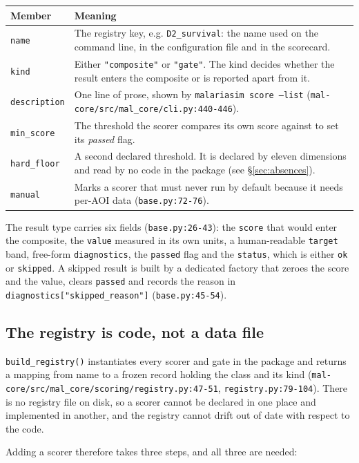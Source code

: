 \documentclass[11pt,a4paper]{article}
\newcommand{\code}[1]{\texttt{#1}}
\begin{document}
\begin{longtable}{@{}p{2.9cm}p{11.1cm}@{}}
\toprule
Member & Meaning \\
\midrule
\endhead
\code{name} & The registry key, e.g. \code{D2\_survival}: the name used on the
command line, in the configuration file and in the scorecard. \\
\code{kind} & Either \code{"composite"} or \code{"gate"}. The kind decides
whether the result enters the composite or is reported apart from it. \\
\code{description} & One line of prose, shown by \code{malariasim score
--list} (\code{mal-core/src/mal\_core/cli.py:440-446}). \\
\code{min\_score} & The threshold the scorer compares its own score against
to set its \emph{passed} flag. \\
\code{hard\_floor} & A second declared threshold. It is declared by eleven
dimensions and read by no code in the package (see
\S\ref{sec:absences}). \\
\code{manual} & Marks a scorer that must never run by default because it
needs per-AOI data (\code{base.py:72-76}). \\
\end{longtable}

The result type carries six fields (\code{base.py:26-43}): the \code{score}
that would enter the composite, the \code{value} measured in its own units, a
human-readable \code{target} band, free-form \code{diagnostics}, the
\code{passed} flag and the \code{status}, which is either \code{ok} or
\code{skipped}. A skipped result is built by a dedicated factory that zeroes
the score and the value, clears \code{passed} and records the reason in
\code{diagnostics["skipped\_reason"]} (\code{base.py:45-54}).

\subsection{The registry is code, not a data file}

\code{build\_registry()} instantiates every scorer and gate in the package
and returns a mapping from name to a frozen record holding the class and its
kind (\code{mal-core/src/mal\_core/scoring/registry.py:47-51},
\code{registry.py:79-104}). There is no registry file on disk, so a scorer
cannot be declared in one place and implemented in another, and the registry
cannot drift out of date with respect to the code.

Adding a scorer therefore takes three steps, and all three are needed:
\end{document}
